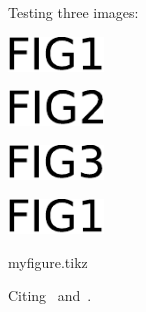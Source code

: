 \documentclass[leqno]{amsart}
\begin{document}
Testing three images:

\begin{center}
  \includegraphics[width=1in]{fig1.pdf}
\end{center}

\begin{center}
  \includegraphics[width=1in]{fig2}
\end{center}

\begin{center}
  \includegraphics[width=1in]{./figs3/fig3}
\end{center}

\begin{center}
  \includegraphics[width=1in]{./other/fig1.pdf}
\end{center}

{myfigure.tikz}



Citing~\cite{entry1} and~\cite{entry2}.



\end{document}
